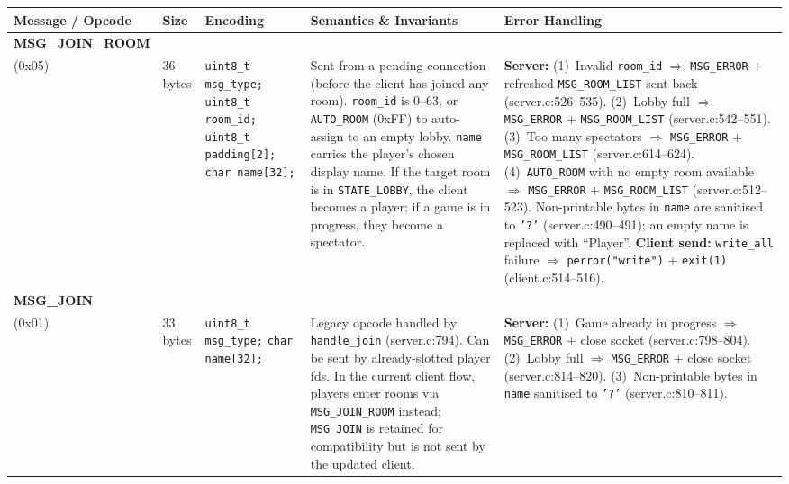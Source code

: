 \documentclass[11pt,letterpaper]{article}
\begin{document}
\begingroup
\small
\begin{longtable}{@{}p{1.8cm} p{1.2cm} p{2.4cm} p{4.2cm} p{4.8cm}@{}}
\toprule
\textbf{Message / Opcode} & \textbf{Size} & \textbf{Encoding} & \textbf{Semantics \& Invariants} & \textbf{Error Handling} \\
\midrule\endhead

\textbf{MSG\_JOIN\_ROOM}\\(0x05) &
36 bytes &
\texttt{uint8\_t msg\_type;}\newline
\texttt{uint8\_t room\_id;}\newline
\texttt{uint8\_t padding[2];}\newline
\texttt{char name[32];} &
Sent from a pending connection (before the client has joined any room). \texttt{room\_id} is 0--63, or \texttt{AUTO\_ROOM} (0xFF) to auto-assign to an empty lobby. \texttt{name} carries the player's chosen display name. If the target room is in \texttt{STATE\_LOBBY}, the client becomes a player; if a game is in progress, they become a spectator. &
\textbf{Server:} (1)~Invalid \texttt{room\_id} $\Rightarrow$ \texttt{MSG\_ERROR} + refreshed \texttt{MSG\_ROOM\_LIST} sent back (server.c:526--535). (2)~Lobby full $\Rightarrow$ \texttt{MSG\_ERROR} + \texttt{MSG\_ROOM\_LIST} (server.c:542--551). (3)~Too many spectators $\Rightarrow$ \texttt{MSG\_ERROR} + \texttt{MSG\_ROOM\_LIST} (server.c:614--624). (4)~\texttt{AUTO\_ROOM} with no empty room available $\Rightarrow$ \texttt{MSG\_ERROR} + \texttt{MSG\_ROOM\_LIST} (server.c:512--523). Non-printable bytes in \texttt{name} are sanitised to \texttt{'?'} (server.c:490--491); an empty name is replaced with ``Player''. \textbf{Client send:} \texttt{write\_all} failure $\Rightarrow$ \texttt{perror("write")} + \texttt{exit(1)} (client.c:514--516). \\[4pt]

\textbf{MSG\_JOIN}\\(0x01) &
33 bytes &
\texttt{uint8\_t msg\_type;}\newline
\texttt{char name[32];} &
Legacy opcode handled by \texttt{handle\_join} (server.c:794). Can be sent by already-slotted player fds. In the current client flow, players enter rooms via \texttt{MSG\_JOIN\_ROOM} instead; \texttt{MSG\_JOIN} is retained for compatibility but is not sent by the updated client. &
\textbf{Server:} (1)~Game already in progress $\Rightarrow$ \texttt{MSG\_ERROR} + close socket (server.c:798--804). (2)~Lobby full $\Rightarrow$ \texttt{MSG\_ERROR} + close socket (server.c:814--820). (3)~Non-printable bytes in \texttt{name} sanitised to \texttt{'?'} (server.c:810--811). \\[4pt]


\end{longtable}
\end{document}
